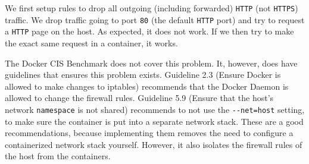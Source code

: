 We first setup rules to drop all outgoing (including forwarded) \lstinline{HTTP} (not \lstinline{HTTPS}) traffic. We drop traffic going to port \lstinline{80} (the default \lstinline{HTTP} port) and try to request a \lstinline{HTTP} page on the host. As expected, it does not work. If we then try to make the exact same request in a container, it works.

\hfill

The Docker CIS Benchmark does not cover this problem. It, however, does have guidelines that ensures this problem exists. Guideline 2.3 (Ensure Docker is allowed to make changes to iptables) recommends that the Docker Daemon is allowed to change the firewall rules. Guideline 5.9 (Ensure that the host's network \lstinline{namespace} is not shared) recommends to not use the \lstinline{--net=host} setting, to make sure the container is put into a separate network stack. These are a good recommendations, because implementing them removes the need to configure a containerized network stack yourself. However, it also isolates the firewall rules of the host from the containers.

